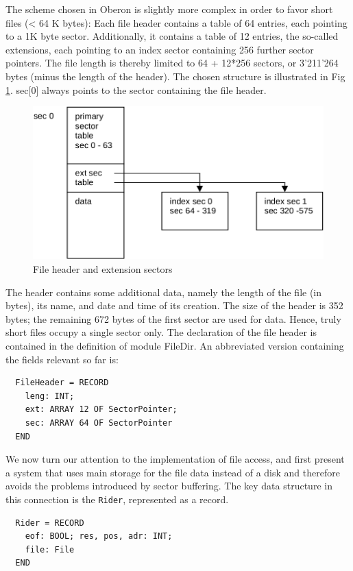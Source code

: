 The scheme chosen in Oberon is slightly more complex in order to favor short files (< 64 K
bytes): Each file header contains a table of 64 entries, each pointing to a 1K byte sector.
Additionally, it contains a table of 12 entries, the so-called extensions, each pointing to an index
sector containing 256 further sector pointers. The file length is thereby limited to 64 + 12*256
sectors, or 3'211'264 bytes (minus the length of the header). The chosen structure is illustrated in
Fig \ref{fig:file-header}. sec[0] always points to the sector containing the file header.
\begin{figure}
  \label{fig:file-header}
  \centering
  \includegraphics[width=\textwidth]{i/l}
  \caption{File header and extension sectors}
\end{figure}

The header contains some additional data, namely the length of the file (in bytes), its name, and
date and time of its creation. The size of the header is 352 bytes; the remaining 672 bytes of the
first sector are used for data. Hence, truly short files occupy a single sector only. The declaration
of the file header is contained in the definition of module FileDir. An abbreviated version
containing the fields relevant so far is:
\begin{verbatim}
  FileHeader = RECORD
    leng: INT;
    ext: ARRAY 12 OF SectorPointer;
    sec: ARRAY 64 OF SectorPointer
  END
\end{verbatim}

We now turn our attention to the implementation of file access, and first present a system that uses
main storage for the file data instead of a disk and therefore avoids the problems introduced by sector
buffering. The key data structure in this connection is the \verb|Rider|, represented as a record.
\begin{verbatim}
  Rider = RECORD
    eof: BOOL; res, pos, adr: INT;
    file: File
  END
\end{verbatim}


